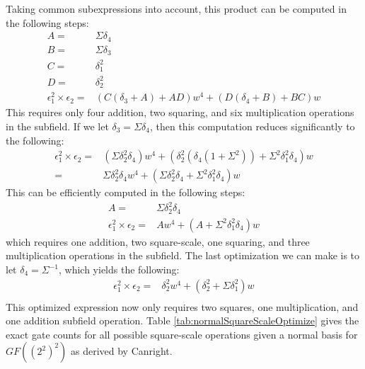 Taking common subexpressions into account, this product can be computed in the following steps:
\begin{align*}
A = & \Sigma\delta_4 \\
B = & \Sigma\delta_3 \\
C = & \delta_1^2 \\
D = & \delta_2^2 \\
\epsilon_1^2 \times \epsilon_2 = & (C(\delta_3 + A) + AD)w^4 + (D(\delta_4 + B) + BC) w
\end{align*}
This requires only four addition, two squaring, and six multiplication operations in the subfield. If we let $\delta_3 = \Sigma\delta_4$, then this computation reduces significantly to the following:
\begin{align*}
\epsilon_1^2 \times \epsilon_2 = & (\Sigma\delta_2^2\delta_4) w^4 + (\delta_2^2(\delta_4(1 + \Sigma^2)) + \Sigma^2\delta_1^2\delta_4) w \\
= & \Sigma\delta_2^2\delta_4 w^4 + (\Sigma\delta_2^2\delta_4 + \Sigma^2\delta_1^2\delta_4) w
\end{align*}
This can be efficiently computed in the following steps:
\begin{align*}
A = & \Sigma\delta_2^2\delta_4 \\
\epsilon_1^2 \times \epsilon_2 = & A w^4 + (A + \Sigma^2\delta_1^2\delta_4) w
\end{align*}
which requires one addition, two square-scale, one squaring, and three multiplication operations in the subfield. The last optimization we can make is to let $\delta_4 = \Sigma^{-1}$, which yields the following:
\begin{align*}
\epsilon_1^2 \times \epsilon_2 = & \delta_2^2 w^4 + (\delta_2^2 + \Sigma\delta_1^2) w \\
\end{align*}
This optimized expression now only requires two squares, one multiplication, and one addition subfield operation. Table \ref{tab:normalSquareScaleOptimize} gives the exact gate counts for all possible square-scale operations given a normal basis for $GF((2^2)^2)$ as derived by Canright.


